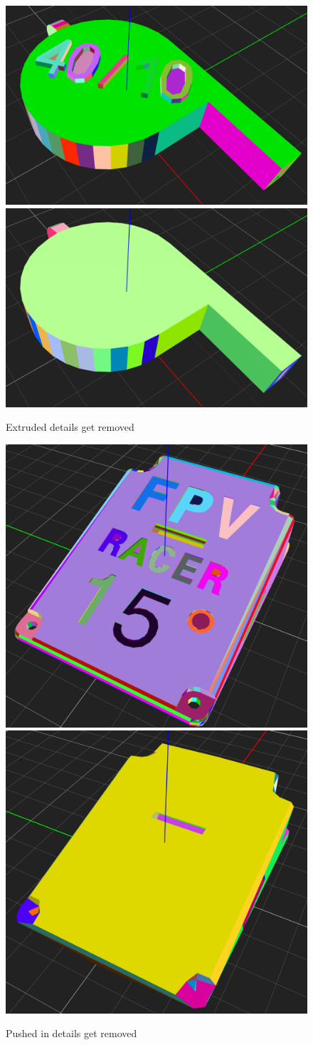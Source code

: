 \documentclass[../ClassicThesis.tex]{subfiles}
\begin{document}
\begin{figure}
\includegraphics[width=0.5\columnwidth]{Images/04-approx-welding-beveled-extruded.png}
\includegraphics[width=0.5\columnwidth]{Images/04-approx-welding-beveled-extruded-result.png}
\caption{Extruded details get removed}
\label{fig:extruded_details}
\end{figure}

\begin{figure}
\includegraphics[width=0.5\columnwidth]{Images/04-approx-welding-pushedIn.png}
\includegraphics[width=0.5\columnwidth]{Images/04-approx-welding-pushedIn-result.png}
\caption{Pushed in details get removed}
\label{fig:pushed_in_details}
\end{figure}
\end{document}
